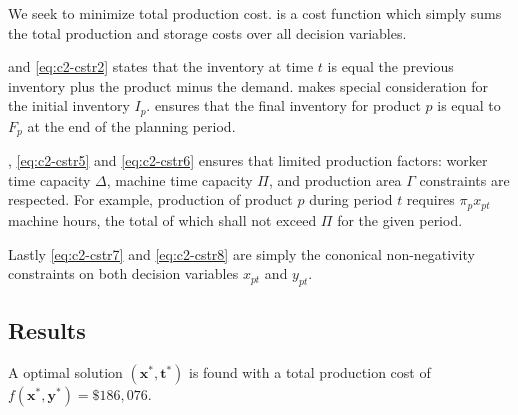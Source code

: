\documentclass[8pt,oneside]{extarticle}
\newcommand{\vect}[1]{\boldsymbol{#1}}
\begin{document}
We seek to minimize total production cost.  is a cost function which simply sums the total production and storage
costs over all decision variables.

 and \cref{eq:c2-cstr2} states that the inventory at time $t$ is
equal the previous inventory plus the product minus the demand. 
makes special consideration for the initial inventory $I_p$. 
ensures that the final inventory for product $p$ is equal to $F_p$ at the end of the
planning period.

, \cref{eq:c2-cstr5} and \cref{eq:c2-cstr6} ensures that limited
production factors: worker time capacity $\Delta$, machine time capacity 
$\Pi$, and production area $\Gamma$ constraints are respected. For example,
production of product $p$ during period $t$ requires $\pi_p x_{pt}$ machine hours, the total
of which shall not exceed $\Pi$ for the given period.

Lastly \cref{eq:c2-cstr7} and \cref{eq:c2-cstr8} are simply the cononical non-negativity
constraints on both decision variables $x_{pt}$ and $y_{pt}$.

\newpage

\subsection{Results}

A optimal solution $\left(\vect{x}^*, \vect{t}^*\right)$ is found with a total 
production cost of $f\left(\vect{x}^*, \vect{y}^*\right) = \$186,076$.
\end{document}
